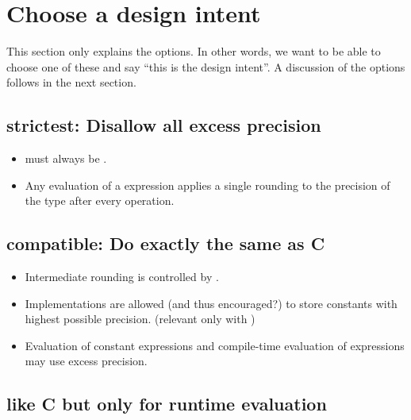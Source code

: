 \section{Choose a design intent}

This section only explains the options.
In other words, we want to be able to choose one of these and say “this is the
design intent”.
A discussion of the options follows in the next section.

\subsection{strictest: Disallow all excess precision}\label{o:1}

\begin{itemize}
  \item {} must always be .

  \item Any evaluation of a \fp expression applies a single rounding to the
    precision of the \fp type after every operation.
\end{itemize}

\subsection{compatible: Do exactly the same as C}\label{o:2}

\begin{itemize}
  \item Intermediate rounding is controlled by .

  \item Implementations are allowed (and thus encouraged?) to store constants
    with highest possible precision. (relevant only with )

  \item Evaluation of constant expressions and compile-time evaluation of
    expressions may use excess precision.
\end{itemize}

\subsection{like C but only for runtime evaluation}\label{o:3}

